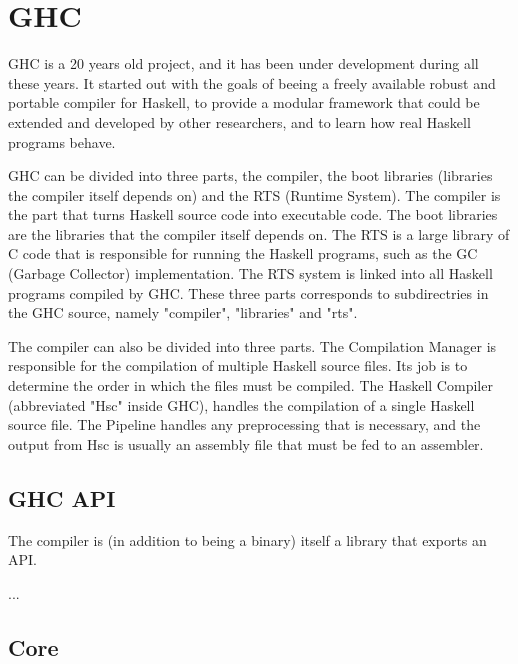 


\section{GHC}

GHC is a 20 years old project, and it has been under development during
all these years. It started out with the goals of beeing a freely available
robust and portable compiler for Haskell, to provide a modular framework that
could be extended and developed by other researchers, and to learn how real
Haskell programs behave. \cite{marlow2012glasgow}

GHC can be divided into three parts, the compiler, the boot libraries
(libraries the compiler itself depends on) and the RTS (Runtime System). 
The compiler is the part
that turns Haskell source code into executable code. The boot libraries are the 
libraries that the compiler itself depends on. The RTS is a large library
of C code that is responsible for running the Haskell programs, such as the 
GC (Garbage Collector) implementation. The RTS system is linked into all 
Haskell programs compiled by GHC. These three parts corresponds to subdirectries
in the GHC source, namely "compiler", "libraries" and "rts".
\cite{marlow2012glasgow}

The compiler can also be divided into three parts. The Compilation Manager is 
responsible for the compilation of multiple Haskell source files. Its job is to
determine the order in which the files must be compiled. The Haskell Compiler 
(abbreviated "Hsc" inside GHC), handles the compilation of a single Haskell source
file. The Pipeline handles any preprocessing that is necessary, and the output
from Hsc is usually an assembly file that must be fed to an assembler.


\subsection{GHC API}

The compiler is (in addition to being a binary) itself a library that exports an API.

... \cite{marlow2012glasgow} 

\subsection{Core}

